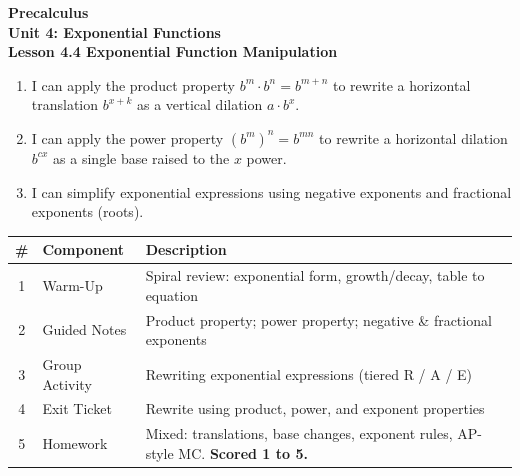 \documentclass[10pt]{article}
\begin{document}
\vspace{-0.8in}

\begin{center}
  {\color{white}\textbf{\LARGE Precalculus}}\\[4pt]
  {\color{skymid}\large\textbf{Unit 4: Exponential Functions}}\\[6pt]
  {\color{white}\textbf{\large Lesson 4.4 \quad Exponential Function Manipulation}}
\end{center}

\vspace{0.22in}
\namedateperiod
\vspace{0.18in}

\begin{learningtargetbox}
\small
\begin{enumerate}[leftmargin=1.5em, itemsep=5pt]
  \item I can apply the product property $b^m \cdot b^n = b^{m+n}$ to rewrite a horizontal
        translation $b^{x+k}$ as a vertical dilation $a \cdot b^x$.
  \item I can apply the power property $(b^m)^n = b^{mn}$ to rewrite a horizontal dilation
        $b^{cx}$ as a single base raised to the $x$ power.
  \item I can simplify exponential expressions using negative exponents and fractional
        exponents (roots).
\end{enumerate}
\end{learningtargetbox}

\vspace{0.14in}

\begin{tocbox}
\small
\renewcommand{\arraystretch}{1.5}
\begin{tabularx}{\linewidth}{@{} c l X @{}}
\rowcolor{sky}
\textbf{\#} & \textbf{Component} & \textbf{Description} \\
\midrule
1 & Warm-Up        & Spiral review: exponential form, growth/decay, table to equation \\
2 & Guided Notes   & Product property; power property; negative \& fractional exponents \\
3 & Group Activity & Rewriting exponential expressions (tiered R / A / E) \\
4 & Exit Ticket    & Rewrite using product, power, and exponent properties \\
5 & Homework       & Mixed: translations, base changes, exponent rules, AP-style MC. \textbf{Scored 1 to 5.} \\
\end{tabularx}
\end{tocbox}
\end{document}
